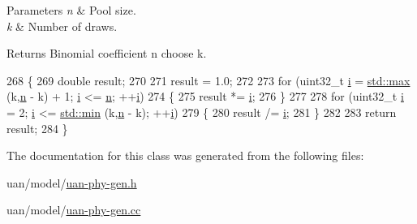 \begin{DoxyParams}{Parameters}
{\em n} & Pool size. \\
\hline
{\em k} & Number of draws. \\
\hline
\end{DoxyParams}
\begin{DoxyReturn}{Returns}
Binomial coefficient n choose k. 
\end{DoxyReturn}

\begin{DoxyCode}
268 \{
269   \textcolor{keywordtype}{double} result;
270 
271   result = 1.0;
272 
273   \textcolor{keywordflow}{for} (uint32\_t \hyperlink{bernuolliDistribution_8m_a6f6ccfcf58b31cb6412107d9d5281426}{i} = \hyperlink{80211b_8c_affe776513b24d84b39af8ab0930fef7f}{std::max} (k,\hyperlink{namespacesample-rng-plot_aeb5ee5c431e338ef39b7ac5431242e1d}{n} - k) + 1; \hyperlink{bernuolliDistribution_8m_a6f6ccfcf58b31cb6412107d9d5281426}{i} <= \hyperlink{namespacesample-rng-plot_aeb5ee5c431e338ef39b7ac5431242e1d}{n}; ++\hyperlink{bernuolliDistribution_8m_a6f6ccfcf58b31cb6412107d9d5281426}{i})
274     \{
275       result *= \hyperlink{bernuolliDistribution_8m_a6f6ccfcf58b31cb6412107d9d5281426}{i};
276     \}
277 
278   \textcolor{keywordflow}{for} (uint32\_t \hyperlink{bernuolliDistribution_8m_a6f6ccfcf58b31cb6412107d9d5281426}{i} = 2; \hyperlink{bernuolliDistribution_8m_a6f6ccfcf58b31cb6412107d9d5281426}{i} <= \hyperlink{80211b_8c_ac6afabdc09a49a433ee19d8a9486056d}{std::min} (k,\hyperlink{namespacesample-rng-plot_aeb5ee5c431e338ef39b7ac5431242e1d}{n} - k); ++\hyperlink{bernuolliDistribution_8m_a6f6ccfcf58b31cb6412107d9d5281426}{i})
279     \{
280       result /= \hyperlink{bernuolliDistribution_8m_a6f6ccfcf58b31cb6412107d9d5281426}{i};
281     \}
282 
283   \textcolor{keywordflow}{return} result;
284 \}
\end{DoxyCode}


The documentation for this class was generated from the following files\+:\begin{DoxyCompactItemize}
\item 
uan/model/\hyperlink{uan-phy-gen_8h}{uan-\/phy-\/gen.\+h}\item 
uan/model/\hyperlink{uan-phy-gen_8cc}{uan-\/phy-\/gen.\+cc}\end{DoxyCompactItemize}
